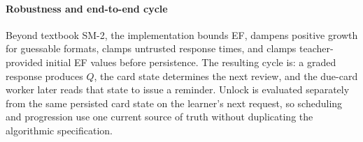 \paragraph{Robustness and end-to-end cycle}
Beyond textbook SM-2, the implementation bounds EF, dampens positive growth for guessable formats, clamps untrusted response times, and clamps teacher-provided initial EF values before persistence. The resulting cycle is: a graded response produces $Q$, the card state determines the next review, and the due-card worker later reads that state to issue a reminder. Unlock is evaluated separately from the same persisted card state on the learner's next request, so scheduling and progression use one current source of truth without duplicating the algorithmic specification.
